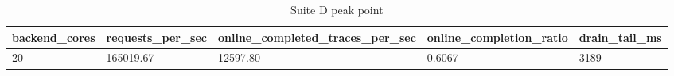 \begin{table}[htbp]
\centering
\caption{Suite D peak point}
\begin{tabular}{lllll}
\hline
backend\_cores & requests\_per\_sec & online\_completed\_traces\_per\_sec & online\_completion\_ratio & drain\_tail\_ms \\
\hline
20 & 165019.67 & 12597.80 & 0.6067 & 3189 \\
\hline
\end{tabular}
\end{table}
